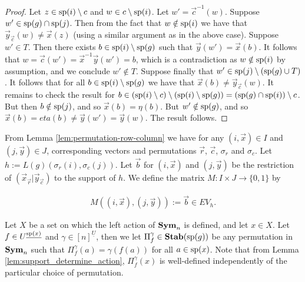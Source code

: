 \documentclass[../paper.tex]{subfiles}
\begin{document}
\begin{proof}
  Let $z \in \text{sp}(i) \setminus c$ and $w \in c \setminus \text{sp}(i)$. Let $w' =
  \vec{c}^{-1}(w)$. Suppose $w' \in \text{sp}(g) \cap \text{sp}(j)$. Then from the
  fact that $w \notin \text{sp}(i)$ we have that $\vec{y}_{\vec{c}}(w) \neq
  \vec{x}(z)$ (using a similar argument as in the above case). Suppose $w' \in
  T$. Then there exists $b \in \text{sp}(i) \setminus \text{sp}(g)$ such that
  $\vec{y}(w') = \vec{x}(b)$. It follows that $w = \vec{c}(w') =
  \vec{x}^{-1}\vec{y} (w') = b$, which is a contradiction as $w \notin
  \text{sp}(i)$ by assumption, and we conclude $w' \notin T$. Suppose finally that
  $w' \in \text{sp}(j) \setminus (\text{sp}(g) \cup T)$. It follows that for all $b
  \in \text{sp}(i) \setminus \text{sp}(g)$ we have that $\vec{x}(b) \neq
  \vec{y}_{\vec{c}}(w)$. It remains to check the result for $b \in (\text{sp}(i)
  \setminus c) \setminus (\text{sp}(i) \setminus \text{sp}(g)) = (\text{sp}(g) \cap
  \text{sp}(i)) \setminus c$. But then $b \notin \text{sp}(j)$, and so $\vec{x}(b) =
  \eta (b)$. But $w' \notin \text{sp}(g)$, and so $\vec{x}(b) = eta(b) \neq
  \vec{y}(w') = \vec{y}(w)$. The result follows.
\end{proof}

From Lemma \ref{lem:permutation-row-column} we have for any $(i, \vec{x}) \in I$
and $(j, \vec{y}) \in J$, corresponding vectors and permutations $\vec{r}$,
$\vec{c}$, $\sigma_r$ and $\sigma_c$. Let $h := L(g)(\sigma_r(i), \sigma_c
(j))$. Let $\vec{b}$ for $(i, \vec{x})$ and $(j, \vec{y})$ be the restriction of
$(\vec{x}_\vec{r} \vert \vec{y}_{\vec{c}})$ to the support of $h$. We define the
matrix $M : I \times J \rightarrow \{0,1\}$ by

\begin{align*}
  M((i , \vec{x}), (j, \vec{y})) := \vec{b} \in EV_h.
\end{align*}



Let $X$ be a set on which the left action of $\text{\textbf{Sym}}_n$ is defined, and let $x \in
X$. Let $f \in U^{\underline{\text{sp}(x)}}$ and $\gamma\in [n]^{\underline{U}}$,
then we let $\Pi^{\gamma}_{f} \in \text{\textbf{Stab}} (\text{sp} (g))$ be any permutation in $\text{\textbf{Sym}}_n$
such that $\Pi^{\gamma}_f (a) = \gamma (f(a))$ for all $a \in \text{sp}(x)$. Note
that from Lemma \ref{lem:support_determine_action}, $\Pi^{\gamma}_f(x)$ is
well-defined independently of the particular choice of permutation.
\end{document}
